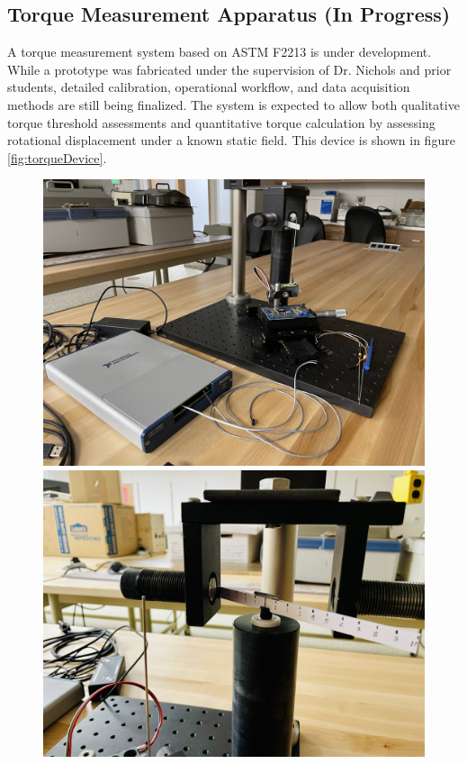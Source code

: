 \subsection{Torque Measurement Apparatus (In Progress)}

A torque measurement system based on ASTM F2213 is under development. While a prototype was fabricated under the supervision of Dr. Nichols and prior students, detailed calibration, operational workflow, and data acquisition methods are still being finalized. The system is expected to allow both qualitative torque threshold assessments and quantitative torque calculation by assessing rotational displacement under a known static field. This device is shown in figure \ref{fig:torqueDevice}.


\begin{figure}[H]
	\centering
	\begin{minipage}[b]{0.48\textwidth}
		\centering
		\includegraphics[width=\textwidth]{Assests/torquesDev.jpg}
		\vspace{0.95cm}
	\end{minipage}
	\hfill
	\begin{minipage}[b]{0.48\textwidth}
		\centering
		\includegraphics[width=\textwidth]{Assests/torquesCloseup.jpg}

\end{minipage}
\end{figure}
